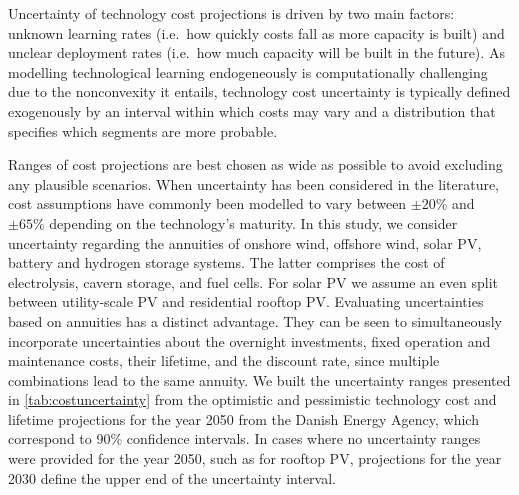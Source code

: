 


Uncertainty of technology cost projections is driven by two main factors:
unknown learning rates (i.e.~how quickly costs fall as more capacity is built)
and unclear deployment rates (i.e.~how much capacity will be built in the
future).\cite{gritsevskyi_modeling_2000,yeh_review_2012} As modelling
technological learning endogeneously is computationally challenging due to the
nonconvexity it
entails,\cite{heuberger_power_2017,mattsson_learning_2019,lisa_learning2022}
technology cost uncertainty is typically defined exogenously by an interval
within which costs may vary and a distribution that specifies which segments are
more probable.


Ranges of cost projections are best chosen as wide as possible to avoid
excluding any plausible scenarios.
\cite{moret_characterization_2017,mccollum_energy_2020} When uncertainty has
been considered in the literature, cost assumptions have commonly been modelled
to vary between $\pm20\%$ and $\pm65\%$ depending on the technology's maturity.
\cite{moret_characterization_2017,shirizadeh_how_2019,pizarro-alonso_uncertainties_2019,li_using_2020,trondle_trade-offs_2020}
In this study, we consider uncertainty regarding the annuities of onshore wind,
offshore wind, solar PV, battery and hydrogen storage systems. The latter
comprises the cost of electrolysis, cavern storage, and fuel cells. For solar PV
we assume an even split between utility-scale PV and residential rooftop PV.
Evaluating uncertainties based on annuities has a distinct advantage. They can
be seen to simultaneously incorporate uncertainties about the overnight
investments, fixed operation and maintenance costs, their lifetime, and the
discount rate, since multiple combinations lead to the same annuity. We built
the uncertainty ranges presented in \cref{tab:costuncertainty} from the
optimistic and pessimistic technology cost and lifetime projections for the year
2050 from the Danish Energy Agency, which correspond to 90\% confidence
intervals.\cite{DEA} In cases where no uncertainty ranges were provided for the
year 2050, such as for rooftop PV, projections for the year 2030 define the
upper end of the uncertainty interval.


